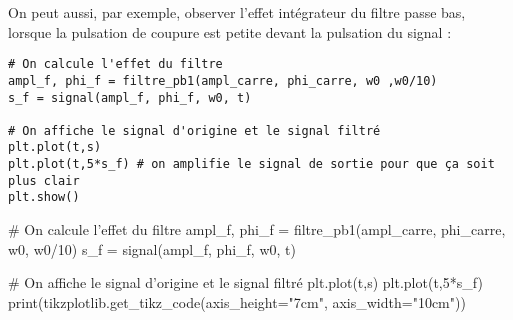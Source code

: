 \documentclass{cours}
\begin{document}
On peut aussi, par exemple, observer l'effet intégrateur du filtre passe bas, lorsque la pulsation de coupure est petite devant la pulsation du signal :

\begin{verbatim}
# On calcule l'effet du filtre
ampl_f, phi_f = filtre_pb1(ampl_carre, phi_carre, w0 ,w0/10)
s_f = signal(ampl_f, phi_f, w0, t)

# On affiche le signal d'origine et le signal filtré
plt.plot(t,s)
plt.plot(t,5*s_f) # on amplifie le signal de sortie pour que ça soit plus clair
plt.show()
\end{verbatim}

\begin{center}
  \begin{pycode}
# On calcule l'effet du filtre
ampl_f, phi_f = filtre_pb1(ampl_carre, phi_carre, w0, w0/10)
s_f = signal(ampl_f, phi_f, w0, t)

# On affiche le signal d'origine et le signal filtré
plt.plot(t,s)
plt.plot(t,5*s_f)
print(tikzplotlib.get_tikz_code(axis_height="7cm", axis_width="10cm"))
  \end{pycode}
\end{center}
\end{document}
